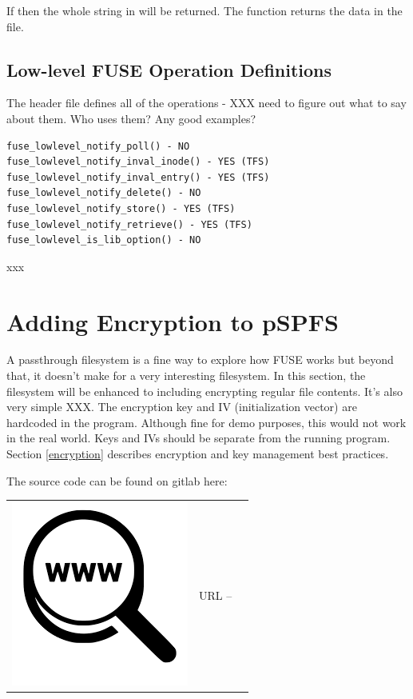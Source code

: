 \noindent
If  then the whole string in  will be returned. The  function returns the data in the file.


\subsection{Low-level FUSE Operation Definitions}

The  header file defines all of the operations - XXX need to figure out what to say about them. Who uses them? Any good examples?

\begin{lstlisting}
fuse_lowlevel_notify_poll() - NO 
fuse_lowlevel_notify_inval_inode() - YES (TFS)
fuse_lowlevel_notify_inval_entry() - YES (TFS)
fuse_lowlevel_notify_delete() - NO
fuse_lowlevel_notify_store() - YES (TFS)
fuse_lowlevel_notify_retrieve() - YES (TFS)
fuse_lowlevel_is_lib_option() - NO
\end{lstlisting}

\noindent
xxx


\section{Adding Encryption to pSPFS}

A passthrough filesystem is a fine way to explore how FUSE works but beyond that, it doesn't make for a very interesting filesystem. In this section, the filesystem will be enhanced to including encrypting regular file contents. It's also very simple XXX. The encryption key and IV (initialization vector) are hardcoded in the program. Although fine for demo purposes, this would not work in the real world. Keys and IVs should be separate from the running program. Section \ref{encryption} describes encryption and key management best practices.

The source code can be found on gitlab here:

\begin{table}[h]
\begin{tabular}{lcl}
\parbox[r]{0.5in}{\includegraphics[scale=0.15]{figures/url.png}} & \parbox[l]{0.55in}{URL  -- } & \parbox[l]{3in}{}
\end{tabular}
\end{table}

